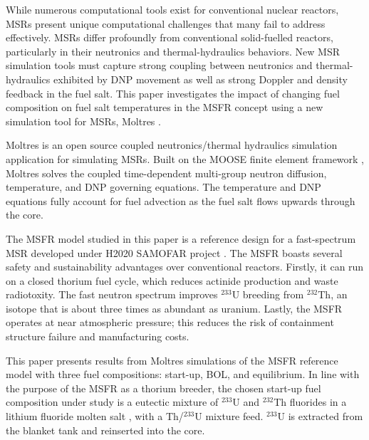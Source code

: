 \documentclass{anstrans}
\begin{document}
	While numerous computational tools exist for conventional nuclear reactors, 
    \glspl{MSR} present unique computational challenges that many fail to 
    address effectively. \glspl{MSR} differ
    profoundly from conventional 
    solid-fuelled reactors, particularly in their neutronics and 
    thermal-hydraulics behaviors.  New \gls{MSR} simulation tools must 
    capture strong coupling between neutronics and thermal-hydraulics 
    exhibited by \gls{DNP} movement as well as strong 
    Doppler and density feedback in the fuel salt.  This paper investigates 
    the impact of changing fuel composition on fuel salt temperatures in the 
    \gls{MSFR} concept using a new simulation tool for \glspl{MSR}, Moltres 
    \cite{lindsay_introduction_2018}.
    
    Moltres is an open source coupled neutronics/thermal hydraulics simulation 
    application for simulating \glspl{MSR}. Built on the \gls{MOOSE} finite 
    element framework \cite{gaston_moose:_2009}, Moltres solves the coupled 
    time-dependent multi-group neutron diffusion, temperature, and 
    \gls{DNP} governing equations.  The temperature and \gls{DNP} equations
    fully 
    account for fuel advection as the fuel salt flows upwards through the 
    core.
    
    The \gls{MSFR} model studied in this paper is a reference design for a 
    fast-spectrum \gls{MSR} developed under H2020
    \gls{SAMOFAR} project \cite{gerardin_design_nodate}.
    The \gls{MSFR} boasts several safety and sustainability advantages over
    conventional reactors. Firstly, it can run on a closed thorium fuel cycle,
    which reduces actinide production and waste radiotoxity.
    The fast neutron spectrum improves $^{233}$U breeding from $^{232}$Th, an
    isotope that is about three times as abundant as uranium.
    Lastly, the \gls{MSFR} operates at near atmospheric pressure; this reduces
    the risk of containment structure failure and manufacturing costs.
    
    This paper presents results from Moltres simulations of the 
    \gls{MSFR} reference model with three fuel compositions:
    start-up, \gls{BOL}, and equilibrium. In line with the purpose of the
    \gls{MSFR} as a thorium breeder, the chosen start-up fuel composition
    under study is a eutectic mixture of $^{233}$U and 
    $^{232}$Th fluorides in a lithium fluoride molten salt 
    \cite{merle-lucotte_launching_2011}, with
    a Th/$^{233}$U mixture feed. $^{233}$U is extracted from
    the blanket tank and reinserted into the core.
    
\end{document}
